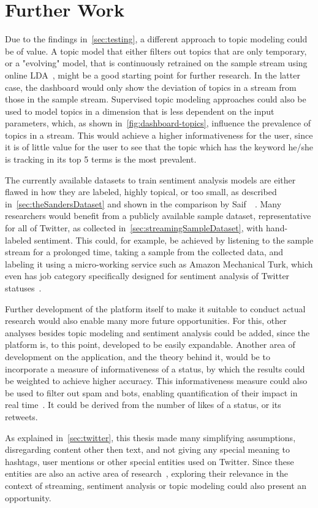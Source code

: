 \chapter{Further Work}
\label{ch:furtherWork}

Due to the findings in~\cref{sec:testing},
a different approach to topic modeling could be of value.
A topic model that either filters out topics that are only temporary,
or a "evolving" model, that is continuously retrained on the sample stream using online LDA~\cite{hoffman2010online},
might be a good starting point for further research.
In the latter case, the dashboard would only show the deviation of topics in a stream from those in the sample stream.
Supervised topic modeling approaches could also be used to model topics in a dimension that is less dependent on the input parameters,
which, as shown in~\cref{fig:dashboard-topics}, influence the prevalence of topics in a stream.
This would achieve a higher informativeness for the user, since it is of little value for the user to
see that the topic which has the keyword he/she is tracking in its top 5 terms is the most prevalent.

The currently available datasets to train sentiment analysis models are either flawed in how they are labeled, highly topical,
or too small, as described in~\cref{sec:theSandersDataset} and shown in the comparison by Saif~\etAl~\cite{Saif2013}.
Many researchers would benefit from a publicly available sample dataset, representative for all of Twitter,
as collected in~\cref{sec:streamingSampleDataset}, with hand-labeled sentiment.
This could, for example, be achieved by listening to the sample stream for a prolonged time,
taking a sample from the collected data, and labeling it using a micro-working service such as Amazon Mechanical Turk,
which even has job category specifically designed for sentiment analysis of Twitter statuses~\cite{mturk}.

Further development of the platform itself to make it suitable to conduct actual research
would also enable many more future opportunities.
For this, other analyses besides topic modeling and sentiment analysis could be added,
since the platform is, to this point, developed to be easily expandable.
Another area of development on the application, and the theory behind it,
would be to incorporate a measure of informativeness of a status,
by which the results could be weighted to achieve higher accuracy.
This informativeness measure could also be used to filter out spam and bots,
enabling quantification of their impact in real time~\cite{haustein2016tweets}.
It could be derived from the number of likes of a status, or its retweets.

As explained in~\cref{sec:twitter}, this thesis made many simplifying assumptions, disregarding content other then text, and not giving any special meaning
to hashtags, user mentions or other special entities used on Twitter.
Since these entities are also an active area of research~\cite{page2012linguistics},
exploring their relevance in the context of streaming, sentiment analysis or topic modeling
could also present an opportunity.